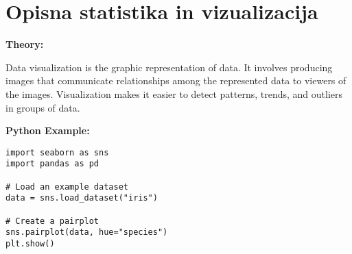 \section{Opisna statistika in vizualizacija}

\begin{multicols}{2}
\noindent
\textbf{Theory:}

Data visualization is the graphic representation of data. It involves producing images that communicate relationships among the represented data to viewers of the images. Visualization makes it easier to detect patterns, trends, and outliers in groups of data.

\columnbreak

\textbf{Python Example:}

\begin{verbatim}
import seaborn as sns
import pandas as pd

# Load an example dataset
data = sns.load_dataset("iris")

# Create a pairplot
sns.pairplot(data, hue="species")
plt.show()
\end{verbatim}
\end{multicols}